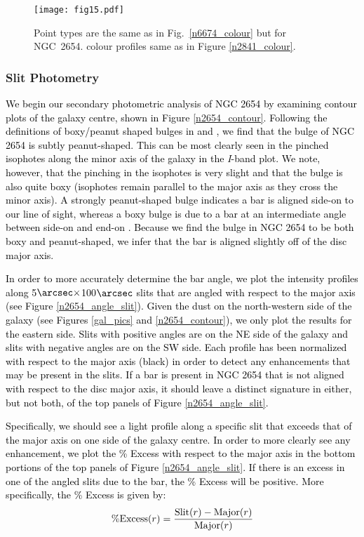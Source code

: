 \documentclass[a4paper,fleqn,usenatbib]{mnras}
\newcommand{\authorfix}{\textcolor{black}}
\begin{document}
\begin{figure}
	\center 
    	\texttt{[image: fig15.pdf]}
  	\caption{Point types are the same as in Fig.~\ref{n6674_colour} but for NGC~2654. colour profiles same as in Figure \ref{n2841_colour}.}
  	\label{n2654_colour}
\end{figure}

\subsubsection{Slit Photometry}
\label{sec:n2654slit}

\authorfix{We begin our secondary photometric analysis of NGC 2654 by examining contour plots of the galaxy centre, shown in Figure \ref{n2654_contour}. Following the definitions of boxy/peanut shaped bulges in \citet{lutticke2000a} and \citet{kuzio2009}, we find that the bulge of NGC 2654 is subtly peanut-shaped. This can be most clearly seen in the pinched isophotes along the minor axis of the galaxy in the \textit{I}-band plot. We note, however, that the pinching in the isophotes is very slight and that the bulge is also quite boxy (isophotes remain parallel to the major axis as they cross the minor axis). A strongly peanut-shaped bulge indicates a bar is aligned side-on to our line of sight, whereas a boxy bulge is due to a bar at an intermediate angle between side-on and end-on \citep{kuzio2009}. Because we find the bulge in NGC 2654 to be both boxy and peanut-shaped, we infer that the bar is aligned slightly off of the disc major axis.}

\authorfix{In order to more accurately determine the bar angle, we plot the intensity profiles along 5$\arcsec \times$100$\arcsec$ slits that are angled with respect to the major axis (see Figure \ref{n2654_angle_slit}). Given the dust on the north-western side of the galaxy (see Figures \ref{gal_pics} and \ref{n2654_contour}), we only plot the results for the eastern side. Slits with positive angles are on the NE side of the galaxy and slits with negative angles are on the SW side. Each profile has been normalized with respect to the major axis (black) in order to detect any enhancements that may be present in the slits. If a bar is present in NGC 2654 that is not aligned with respect to the disc major axis, it should leave a distinct signature in either, but not both, of the top panels of Figure \ref{n2654_angle_slit}.}

\authorfix{Specifically, we should see a light profile along a specific slit that exceeds that of the major axis on one side of the galaxy centre. In order to more clearly see any enhancement, we plot the \% Excess with respect to the major axis in the bottom portions of the top panels of Figure \ref{n2654_angle_slit}. If there is an excess in one of the angled slits due to the bar, the \% Excess will be positive. More specifically, the \% Excess is given by:
\begin{equation}
	\% {\rm Excess} (r) = \frac{{\rm Slit}(r) - {\rm Major}(r)}{{\rm Major}(r)}
\end{equation}}
\end{document}
